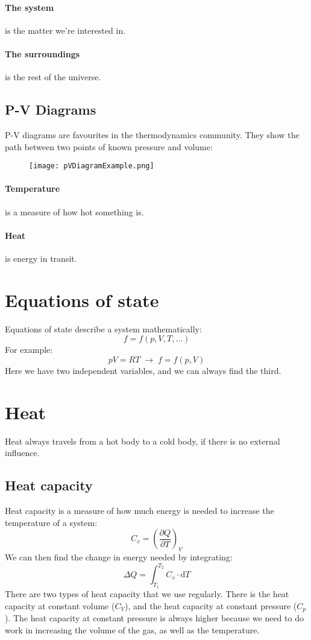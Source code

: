 \paragraph{The system} is the matter we're interested in.
\paragraph{The surroundings} is the rest of the universe.

\subsection{P-V Diagrams}

P-V diagrams are favourites in the thermodynamics community. They show the path
between two points of known pressure and volume:
\begin{figure}[h!]
	\centering
	\texttt{[image: pVDiagramExample.png]}
\end{figure}

\paragraph{Temperature} is a measure of how hot something is.
\paragraph{Heat} is energy in transit.

\section{Equations of state}

Equations of state describe a system mathematically:
$$
	f = f(p, V, T, \hdots)
$$
For example:
$$
	pV = RT \; \rightarrow \; f = f(p, V)
$$
Here we have two independent variables, and we can always find the third.

\section{Heat}

Heat always travels from a hot body to a cold body, if there is no external
influence.

\subsection{Heat capacity}

Heat capacity is a measure of how much energy is needed to increase the
temperature of a system:
$$
	C_v = \left(\frac{\partial Q}{\partial T}\right)_V
$$
We can then find the change in energy needed by integrating:
$$
	\Delta Q = \int^{T_2}_{T_1} C_v \cdot \mathrm{d} T
$$
There are two types of heat capacity that we use regularly. There is the heat
capacity at constant volume ($C_V$), and the heat capacity at constant pressure
($C_p$). The heat capacity at constant pressure is always higher because we need
to do work in increasing the volume of the gas, as well as the temperature.

